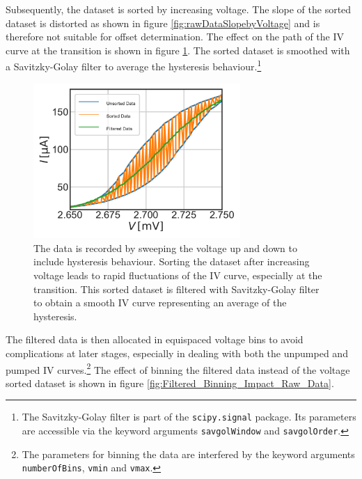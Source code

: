 \documentclass[]{article}
\begin{document}
Subsequently, the dataset is sorted by increasing voltage. The slope of the sorted dataset is distorted as shown in figure \ref{fig:rawDataSlopebyVoltage} and is therefore not suitable for offset determination. The effect on the path of the IV curve at the transition is shown in figure \ref{fig:Sorted_vs_Unsorted_vs_Filtered_Raw_Data}. The sorted dataset is smoothed with a Savitzky-Golay filter to average the hysteresis behaviour.\footnote{The Savitzky-Golay filter is part of the \texttt{scipy.signal} package. Its parameters are accessible via the keyword arguments \texttt{savgolWindow} and \texttt{savgolOrder}. }
\begin{figure}
	\centering
	\includegraphics[width=0.7\textwidth]{./../IV_Class_Unit_Test/2020_01_14/Sorted_vs_Unsorted_vs_Filtered_Raw_Data.pdf}
	\caption{The data is recorded by sweeping the voltage up and down to include hysteresis behaviour. Sorting the dataset after increasing voltage leads to rapid fluctuations of the IV curve, especially at the transition. This sorted dataset is filtered with Savitzky-Golay filter to obtain a smooth IV curve representing an average of the hysteresis.}
	\label{fig:Sorted_vs_Unsorted_vs_Filtered_Raw_Data}
\end{figure}

The filtered data is then allocated in equispaced voltage bins to avoid complications at later stages, especially in dealing with both the unpumped and pumped IV curves.\footnote{The parameters for binning the data are interfered by the keyword arguments \texttt{numberOfBins}, \texttt{vmin} and \texttt{vmax}.} The effect of binning the filtered data instead of the voltage sorted dataset is shown in figure \ref{fig:Filtered_Binning_Impact_Raw_Data}.
\end{document}
